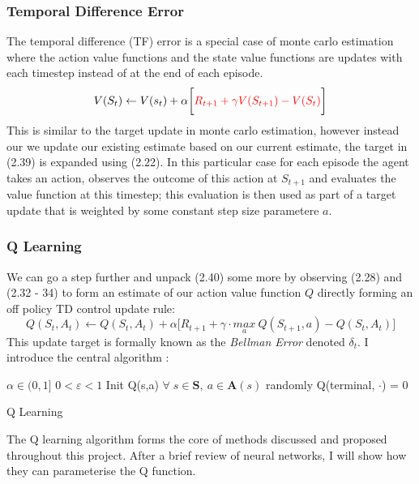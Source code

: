 \subsubsection{Temporal Difference Error}
The temporal difference (TF) error is a special case of monte carlo estimation where the action
value functions and the state value functions are updates with each timestep instead of at the end of each episode.
\begin{equation}
    V(S_t) \leftarrow V(s_t) + \alpha \biggl[\textcolor{red}{R_{t+1} + \gamma V(S_{t+1}) - V(S_t)} \biggl]
\end{equation}
This is similar to the target update in monte carlo estimation, however instead our we update
our existing estimate based on our current estimate, the target in (2.39) is expanded using (2.22).
In this particular case for each episode the agent takes an action, observes the outcome of this action at $S_{t+1}$
and evaluates the value function at this timestep; this evaluation is then used as part of a target update
that is weighted by some constant step size parametere $a$.
\subsubsection{Q Learning}
We can go a step further and unpack (2.40) some more by observing (2.28) and (2.32 - 34) to
form an estimate of our action value function $Q$ directly forming an off policy TD control update rule:
\begin{equation}
    Q(S_t,A_t) \leftarrow Q(S_t,A_t) + \alpha \biggl [R_{t+1} + \gamma \cdot \underset{a}{max} \: Q(S_{t+1}, a) - Q(S_t,A_t) \biggl ]
\end{equation}
This update target is formally known as the \emph{Bellman Error} denoted $\delta_t$. I introduce 
the central algorithm \cite{sutton2018reinforcement}:
\begin{algorithm}[!htb]
    \SetAlgoLined
     $\alpha \in (0,1]$\;
     $0 < \varepsilon < 1$\;
     Init Q(s,a) $\forall \; s \in \mathbf{S}, \: a \in \mathbf{A}(s)$ randomly\;
     Q(terminal, $\cdot$) = 0\;
     \caption{Q Learning }
\end{algorithm}
The Q learning algorithm forms the core of methods discussed and proposed throughout this project.
After a brief review of neural networks, I will show how they can parameterise the Q function.
